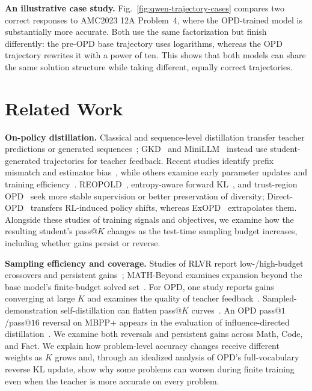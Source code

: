 \documentclass{article}
\theoremstyle{opdplain}
\begin{document}
\noindent\textbf{An illustrative case study.}
Fig.~\ref{fig:qwen-trajectory-cases} compares two correct responses to AMC2023 12A Problem~4, where the OPD-trained model is substantially more accurate. Both use the same factorization but finish differently: the pre-OPD base trajectory uses logarithms, whereas the OPD trajectory rewrites it with a power of ten. This shows that both models can share the same solution structure while taking different, equally correct trajectories.

\section{Related Work}
\label{sec:related-work}

\noindent\textbf{On-policy distillation.} Classical and sequence-level distillation transfer teacher predictions or generated sequences~\citep{hinton2015distilling,kim-rush-2016-sequence}; GKD~\citep{agarwal2024onpolicy} and MiniLLM~\citep{gu2024minillm} instead use student-generated trajectories for teacher feedback. Recent studies identify prefix mismatch and estimator bias~\citep{fu2026revisitingopd,zhu2026facesonpolicydistillationpitfalls}, while others examine early parameter updates and training efficiency~\citep{cai2026foresee}. REOPOLD~\citep{ko2026reopold}, entropy-aware forward KL~\citep{jin2026entropyopd}, and trust-region OPD~\citep{xing2026tropd} seek more stable supervision or better preservation of diversity; Direct-OPD~\citep{feng2026directopd} transfers RL-induced policy shifts, whereas ExOPD~\citep{yang2026exopd} extrapolates them. Alongside these studies of training signals and objectives, we examine how the resulting student's pass@$K$ changes as the test-time sampling budget increases, including whether gains persist or reverse.

\noindent\textbf{Sampling efficiency and coverage.} Studies of RLVR report low-/high-budget crossovers and persistent gains~\citep{yue2025rlcapacity,wu2025invisibleleash,liu2025prorl}; MATH-Beyond examines expansion beyond the base model's finite-budget solved set~\citep{mayilvahanan2026mathbeyond}. For OPD, one study reports gains converging at large $K$ and examines the quality of teacher feedback~\citep{wang2026demystifyingopd}. Sampled-demonstration self-distillation can flatten pass@$K$ curves~\citep{nicolicioiu2026}. An OPD pass@$1$/pass@$16$ reversal on MBPP+ appears in the evaluation of influence-directed distillation~\citep{yang2026influencedirected}. We examine both reversals and persistent gains across Math, Code, and Fact. We explain how problem-level accuracy changes receive different weights as $K$ grows and, through an idealized analysis of OPD's full-vocabulary reverse KL update, show why some problems can worsen during finite training even when the teacher is more accurate on every problem.
\end{document}
